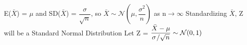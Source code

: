 \documentclass[]{article}
\begin{document}
\newline
\newline E($\bar{X}$) = $\mu$ and SD($\bar{X}$) = $\dfrac{\sigma}{\sqrt{n}}$, so $\bar{X} \sim \mathcal{N}(\mu, \dfrac{\sigma ^2}{ n })  $ as n$\to \infty$
\newline
\newline Standardizing $\bar{X}$, Z will be a Standard Normal Distribution
\newline 
\newline Let Z = $\dfrac{\bar{X} - \mu}{\sigma \\/ \sqrt{n} } \sim \mathcal{N}(0, 1) $
 
\section{}
\end{document}
